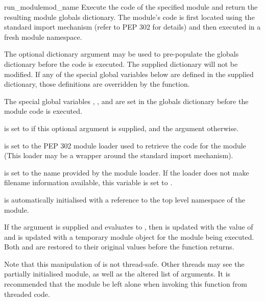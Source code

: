 \begin{funcdesc}{run_module}{mod_name
}
Execute the code of the specified module and return the resulting
module globals dictionary. The module's code is first located using
the standard import mechanism (refer to PEP 302 for details) and
then executed in a fresh module namespace.

The optional dictionary argument  may be used to
pre-populate the globals dictionary before the code is executed.
The supplied dictionary will not be modified. If any of the special
global variables below are defined in the supplied dictionary, those
definitions are overridden by the  function.

The special global variables , ,
 and  are set in the globals
dictionary before the module code is executed.

 is set to  if this optional argument is
supplied, and the  argument otherwise.

 is set to the PEP 302 module loader used to retrieve
the code for the module (This loader may be a wrapper around the
standard import mechanism).

 is set to the name provided by the module loader. If
the loader does not make filename information available, this
variable is set to .

 is automatically initialised with a reference to
the top level namespace of the  module.

If the argument  is supplied and evaluates to
, then  is updated with the value of
 and  is updated with a
temporary module object for the module being executed. Both
 and  are restored to
their original values before the function returns.

Note that this manipulation of  is not thread-safe. Other
threads may see the partially initialised module, as well as the
altered list of arguments. It is recommended that the 
module be left alone when invoking this function from threaded code.
\end{funcdesc}

\begin{seealso}


\end{seealso}

